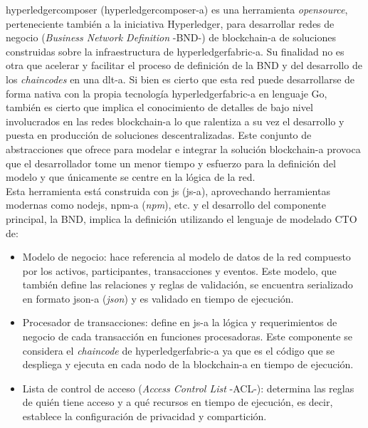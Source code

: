 \documentclass[12pt,a4paper, twoside]{report}
\begin{document}
	\Gls{hyperledgercomposer} (\gls{hyperledgercomposer-a}) es una herramienta \textit{\gls{opensource}}, perteneciente también a la iniciativa Hyperledger, para desarrollar redes de negocio (\textit{Business Network Definition} -BND-) de \gls{blockchain-a} de soluciones construidas sobre la infraestructura de \gls{hyperledgerfabric-a}. Su finalidad no es otra que acelerar y facilitar el proceso de definición de la BND y del desarrollo de los \textit{chaincodes} en una \gls{dlt-a}. Si bien es cierto que esta red puede desarrollarse de forma nativa con la propia tecnología \gls{hyperledgerfabric-a} en lenguaje Go, también es cierto que implica el conocimiento de detalles de bajo nivel involucrados en las redes \gls{blockchain-a} lo que ralentiza a su vez el desarrollo y puesta en producción de soluciones descentralizadas. Este conjunto de abstracciones que ofrece para modelar e integrar la solución \gls{blockchain-a} provoca que el desarrollador tome un menor tiempo y esfuerzo para la definición del modelo y que únicamente se centre en la lógica de la red. \\
	
	Esta herramienta está construida con \gls{js} (\gls{js-a}), aprovechando herramientas modernas como \gls{nodejs}, \gls{npm-a} (\textit{\gls{npm}}), etc. y el desarrollo del componente principal, la BND, implica la definición utilizando el lenguaje de modelado CTO de:
	
	\begin{itemize}
		\item Modelo de negocio: hace referencia al modelo de datos de la red compuesto por los activos, participantes, transacciones y eventos. Este modelo, que también define las relaciones y reglas de validación, se encuentra serializado en formato \gls{json-a} (\textit{\gls{json}}) y es validado en tiempo de ejecución. 
		
		\item Procesador de transacciones: define en \gls{js-a} la lógica y requerimientos de negocio de cada transacción en funciones procesadoras. Este componente se considera el \textit{\gls{chaincode}} de \gls{hyperledgerfabric-a} ya que es el código que se despliega y ejecuta en cada nodo de la \gls{blockchain-a} en tiempo de ejecución.
	
		\item Lista de control de acceso (\textit{Access Control List} -ACL-): determina las reglas de quién tiene acceso y a qué recursos en tiempo de ejecución, es decir, establece la configuración de privacidad y compartición.
	\end{itemize}
\end{document}
